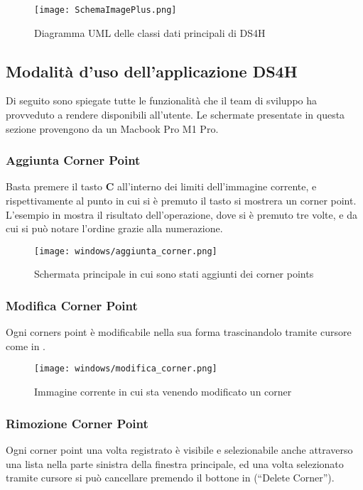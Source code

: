 \begin{figure}[H]
    \centering
    \texttt{[image: SchemaImagePlus.png]}
    \caption{Diagramma UML delle classi dati principali di DS4H}
    \label{fig:9}
\end{figure}


\subsection{Modalità d'uso dell'applicazione DS4H}
\noindent Di seguito sono spiegate tutte le funzionalità che il team di sviluppo ha provveduto a rendere disponibili all'utente.
Le schermate presentate in questa sezione provengono da un Macbook Pro M1 Pro.

\subsubsection{Aggiunta Corner Point}
\noindent Basta premere il tasto \textbf{C} all'interno dei limiti dell'immagine corrente, e rispettivamente al punto in cui si è premuto il tasto si mostrera un corner point.
L'esempio in  mostra il risultato dell'operazione, dove si è premuto tre volte, e da cui si può notare l'ordine grazie alla numerazione.
\begin{figure}[H]
    \centering
    \texttt{[image: windows/aggiunta\_corner.png]}
    \caption{Schermata principale in cui sono stati aggiunti dei corner points}
    \label{fig:10}
\end{figure}

\subsubsection{Modifica Corner Point}
\noindent Ogni corners point è modificabile nella sua forma trascinandolo tramite cursore come in .
\begin{figure}[H]
    \centering
    \texttt{[image: windows/modifica\_corner.png]}
    \caption{Immagine corrente in cui sta venendo modificato un corner}
    \label{fig:11}
\end{figure}

\subsubsection{Rimozione Corner Point}
\noindent Ogni corner point una volta registrato è visibile e selezionabile anche attraverso una lista nella parte sinistra della finestra principale, ed una volta selezionato tramite cursore si può cancellare premendo il bottone in  (``Delete Corner'').

